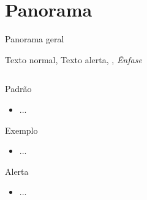 \documentclass[table,xcolor=table]{apresentações/exemplo 2/IFMG-beamer}
\begin{document}
\section{Panorama}
\begin{frame}{Panorama geral}

Texto normal, \alert{Texto alerta},  , \emph{Ênfase}
\begin{columns}

\begin{column}{0.5\textwidth}

\begin{block}{Padrão}
  \begin{itemize}
  	\item ...
  \end{itemize}
\end{block}

\pause

\begin{exampleblock}{Exemplo}
  \begin{itemize}
  	\item ...
  \end{itemize}
\end{exampleblock}

\pause

\begin{alertblock}{Alerta}
  \begin{itemize}
  	\item ...
  \end{itemize}
\end{alertblock}

\end{column}


\pause
\begin{column}{0.5\textwidth}





\end{column}

\end{columns}
\end{frame}
\end{document}
